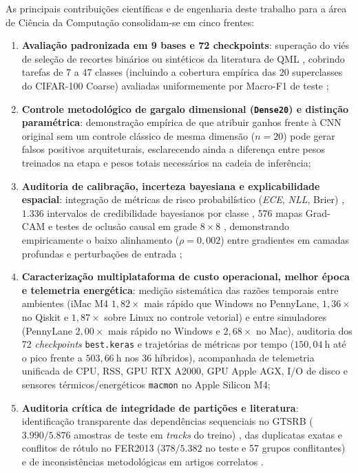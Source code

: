 \documentclass[
    12pt,
    openright,
    oneside,
    a4paper,
    english,
    brazil
]{abntex2}
\begin{document}
As principais contribuições científicas e de engenharia deste trabalho para a área de Ciência da Computação consolidam-se em cinco frentes:
\begin{enumerate}
    \item \textbf{Avaliação padronizada em 9 bases e 72 checkpoints}: superação do viés de seleção de recortes binários ou sintéticos da literatura de QML \cite{long2025qcqcnn,bokhan2022qcnn,daka2026noqcnn}, cobrindo tarefas de 7 a 47 classes (incluindo a cobertura empírica das 20 superclasses do CIFAR-100 Coarse) avaliadas uniformemente por Macro-F1 de teste \cite{fawcett2006roc,sokolova2009systematic};
    \item \textbf{Controle metodológico de gargalo dimensional (\texttt{Dense20}) e distinção paramétrica}: demonstração empírica de que atribuir ganhos frente à CNN original sem um controle clássico de mesma dimensão (\(n=20\)) pode gerar falsos positivos arquiteturais, esclarecendo ainda a diferença entre pesos treinados na etapa e pesos totais necessários na cadeia de inferência;
    \item \textbf{Auditoria de calibração, incerteza bayesiana e explicabilidade espacial}: integração de métricas de risco probabilístico (\textit{ECE}, \textit{NLL}, Brier) \cite{guo2017calibration,brier1950verification}, \(1.336\) intervalos de credibilidade bayesianos por classe \cite{wang2019bayestest}, 576 mapas Grad-CAM \cite{selvaraju2020gradcam} e testes de oclusão causal em grade \(8 \times 8\) \cite{zeiler2014visualizing}, demonstrando empiricamente o baixo alinhamento (\(\rho = 0{,}002\)) entre gradientes em camadas profundas e perturbações de entrada \cite{adebayo2018sanity};
    \item \textbf{Caracterização multiplataforma de custo operacional, melhor época e telemetria energética}: medição sistemática das razões temporais entre ambientes (iMac M4 \(1{,}82\times\) mais rápido que Windows no PennyLane, \(1{,}36\times\) no Qiskit e \(1{,}87\times\) sobre Linux no controle vetorial) e entre simuladores (PennyLane \(2{,}00\times\) mais rápido no Windows e \(2{,}68\times\) no Mac), auditoria dos 72 \textit{checkpoints} \texttt{best.keras} e trajetórias de métricas por tempo (\(150{,}04~\text{h}\) até o pico frente a \(503{,}66~\text{h}\) nos 36 híbridos), acompanhada de telemetria unificada de CPU, RSS, GPU RTX A2000, GPU Apple AGX, I/O de disco e sensores térmicos/energéticos \texttt{macmon} no Apple Silicon M4;
    \item \textbf{Auditoria crítica de integridade de partições e literatura}: identificação transparente das dependências sequenciais no GTSRB (\(3.990/5.876\) amostras de teste em \textit{tracks} do treino) \cite{stallkamp2012gtsrb}, das duplicatas exatas e conflitos de rótulo no FER2013 (\(378/5.382\) no teste e 57 grupos conflitantes) e de inconsistências metodológicas em artigos correlatos \cite{Wazlawick2020}.
\end{enumerate}
\end{document}
